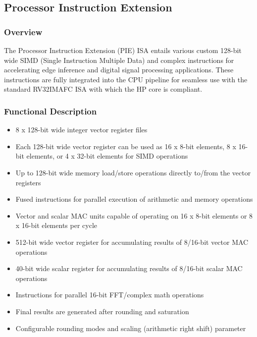 \documentclass[main\_\_EN.tex]{subfiles}
\begin{document}

\newpage
\subsection{Processor Instruction Extension}
\label{sec:riscvcpu-pie}

\subsubsection{Overview}
\label{sec:riscvcpu-pie-overview}

The Processor Instruction Extension (PIE) ISA entails various custom 128-bit wide SIMD (Single Instruction Multiple Data) and complex instructions for accelerating edge inference and digital signal processing applications. These instructions are fully integrated into the CPU pipeline for seamless use with the standard RV32IMAFC ISA with which the HP core is compliant.

\subsubsection{Functional Description}
\label{sec:riscvcpu-pie-func-descr}

\begin{itemize}
    \item 8 x 128-bit wide integer vector register files
    \item Each 128-bit wide vector register can be used as 16 x 8-bit elements, 8 x 16-bit elements, or 4 x 32-bit elements for SIMD operations
    \item Up to 128-bit wide memory load/store operations directly to/from the vector registers
    \item Fused instructions for parallel execution of arithmetic and memory operations
    \item Vector and scalar MAC units capable of operating on 16 x 8-bit elements or 8 x 16-bit elements per cycle
    \item 512-bit wide vector register for accumulating results of 8/16-bit vector MAC operations
    \item 40-bit wide scalar register for accumulating results of 8/16-bit scalar MAC operations
    \item Instructions for parallel 16-bit FFT/complex math operations
    \item Final results are generated after rounding and saturation
    \item Configurable rounding modes and scaling (arithmetic right shift) parameter
\end{itemize}
\end{document}
